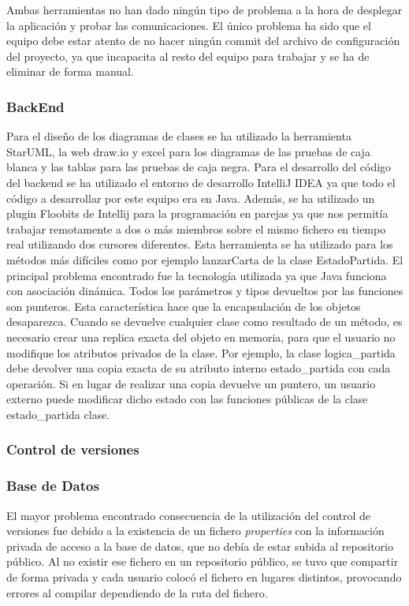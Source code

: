 Ambas herramientas no han dado ningún tipo de problema a la hora de desplegar la aplicación y probar las comunicaciones. El único problema ha sido que el equipo debe estar atento de no hacer ningún commit del archivo de configuración del proyecto, ya que incapacita al resto del equipo para trabajar y se ha de eliminar de forma manual.


\subsubsection*{BackEnd}
Para el diseño de los diagramas de clases se ha utilizado la herramienta StarUML, la web draw.io y excel para los diagramas de las pruebas de caja blanca y las tablas para las pruebas de caja negra.
Para el desarrollo del código del backend se ha utilizado el entorno de desarrollo IntelliJ IDEA ya que todo el código a desarrollar por este equipo era en Java.
Además, se ha utilizado un plugin Floobits de Intellij para la programación en parejas ya que nos permitía trabajar remotamente a dos o más miembros sobre el mismo fichero en tiempo real utilizando dos cursores diferentes. Esta herramienta se ha utilizado para los métodos más difíciles como por ejemplo lanzarCarta de la clase EstadoPartida.
El principal problema encontrado fue la tecnología utilizada ya que Java funciona con asociación dinámica. Todos los parámetros y tipos devueltos por las funciones son punteros. Esta característica hace que la encapsulación de los objetos desaparezca. Cuando se devuelve cualquier clase como resultado de un método, es necesario crear una replica exacta del objeto en memoria, para que el usuario no modifique los atributos privados de la clase. Por ejemplo, la clase logica\_partida debe devolver una copia exacta de su atributo interno estado\_partida con cada operación. Si en lugar de realizar una copia devuelve un puntero, un usuario externo puede modificar dicho estado con las funciones públicas de la clase estado\_partida clase.
\subsubsection{Control de versiones}
\subsubsection*{Base de Datos}
El mayor problema encontrado consecuencia de la utilización del control de versiones fue debido a la existencia de un fichero \textit{properties} con la información privada de acceso a la base de datos, que no debía de estar subida al repositorio público. Al no existir ese fichero en un repositorio público, se tuvo que compartir de forma privada y cada usuario colocó el fichero en lugares distintos, provocando errores al compilar dependiendo de la ruta del fichero.
